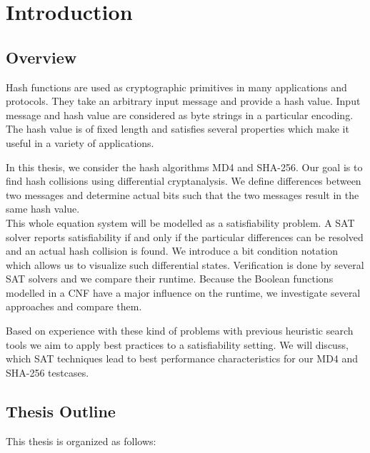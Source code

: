 \renewcommand*\chappic{img/intro.pdf}
\renewcommand*\chapquote{}
\renewcommand*\chapquotesrc{}
%
\chapter{Introduction}
\label{ch:intro}
\section{Overview}
\label{sec:intro-overview}
%
Hash functions are used as cryptographic primitives in many applications and protocols.
They take an arbitrary input message and provide a hash value. Input message and hash value
are considered as byte strings in a particular encoding.
The hash value is of fixed length and satisfies several properties which make it useful
in a variety of applications.

In this thesis, we consider the hash algorithms MD4 and SHA-256.
Our goal is to find hash collisions using differential cryptanalysis.
We define differences between two messages and determine actual bits
such that the two messages result in the same hash value. \\
This whole equation system will be modelled as a satisfiability problem.
A SAT solver reports satisfiability if and only if the particular
differences can be resolved and an actual hash collision is found.
We introduce a bit condition notation which allows us to visualize
such differential states. Verification is done by several SAT solvers
and we compare their runtime. Because the Boolean functions modelled in
a CNF have a major influence on the runtime, we investigate several
approaches and compare them.

Based on experience with these kind of problems with previous heuristic search tools
we aim to apply best practices to a satisfiability setting.
We will discuss, which SAT techniques lead to best performance characteristics
for our MD4 and SHA-256 testcases.

\section{Thesis Outline}
\label{sec:intro-outline}
%
This thesis is organized as follows:

